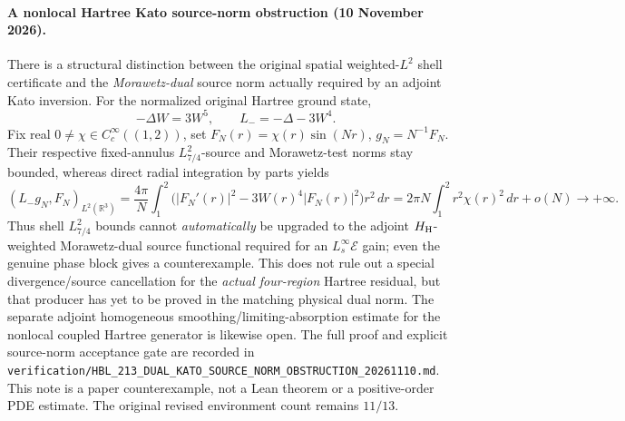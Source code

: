 \documentclass[11pt]{amsart}
\begin{document}
\paragraph{A nonlocal Hartree Kato source-norm obstruction (10 November 2026).}
There is a structural distinction between the original spatial
weighted-\(L^2\) shell certificate and the \emph{Morawetz-dual}
source norm actually required by an adjoint Kato inversion.
For the normalized original Hartree ground state,
\[
-\Delta W=3W^5,\qquad
 L_-=-\Delta-3W^4.
\]
Fix real \(0\ne\chi\in C_c^\infty((1,2))\), set
\(F_N(r)=\chi(r)\sin(Nr)\), \(g_N=N^{-1}F_N\).
Their respective fixed-annulus \(L^2_{7/4}\)-source and
Morawetz-test norms stay bounded, whereas direct radial integration
by parts yields
\[
  (L_-g_N,F_N)_{L^2(\mathbb R^3)}
  =\frac{4\pi}{N}\int_1^2
      \bigl(|F_N'(r)|^2-3W(r)^4|F_N(r)|^2\bigr)r^2\,dr
  =2\pi N\int_1^2 r^2\chi(r)^2\,dr+o(N)\longrightarrow+\infty.
\]
Thus shell \(L^2_{7/4}\) bounds cannot \emph{automatically} be
upgraded to the adjoint \(H_{\rm H}\)-weighted
Morawetz-dual source functional required for an
\(L_s^\infty\mathcal E\) gain; even the genuine phase
block gives a counterexample. This does not rule out a special
divergence/source cancellation for the \emph{actual four-region}
Hartree residual, but that producer has yet to be proved in
the matching physical dual norm. The separate adjoint homogeneous
smoothing/limiting-absorption estimate for the nonlocal
coupled Hartree generator is likewise open.
The full proof and explicit source-norm acceptance gate are
recorded in
\texttt{verification/HBL\_213\_DUAL\_KATO\_SOURCE\_NORM\_OBSTRUCTION\_20261110.md}.
This note is a paper counterexample, not a Lean theorem
or a positive-order PDE estimate. The original revised
environment count remains \(11/13\).
\end{document}
